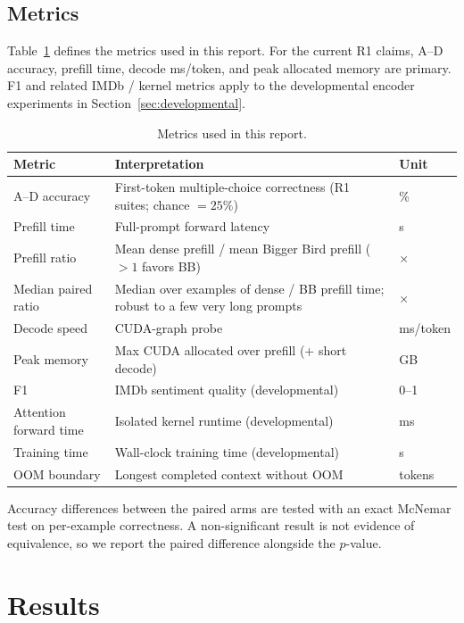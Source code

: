 \documentclass[11pt]{article}
\begin{document}
\subsection{Metrics}
\label{sec:metrics}

Table~\ref{tab:metrics} defines the metrics used in this report. For the
current R1 claims, A--D accuracy, prefill time, decode ms/token, and peak
allocated memory are primary. F1 and related IMDb / kernel metrics apply to
the developmental encoder experiments in Section~\ref{sec:developmental}.

\begin{table}[ht]
  \centering
  \small
  \caption{Metrics used in this report.}
  \label{tab:metrics}
  \begin{tabularx}{\textwidth}{@{}lXl@{}}
    \toprule
    Metric & Interpretation & Unit \\
    \midrule
    A--D accuracy & First-token multiple-choice correctness (R1 suites;
      chance $=25\%$) & \% \\
    Prefill time & Full-prompt forward latency & s \\
    Prefill ratio & Mean dense prefill / mean Bigger Bird prefill
      ($>1$ favors BB) & $\times$ \\
    Median paired ratio & Median over examples of dense / BB prefill time;
      robust to a few very long prompts & $\times$ \\
    Decode speed & CUDA-graph probe 
    
    
    & ms/token \\
    Peak memory & Max CUDA allocated over prefill (+ short decode) & GB \\
    F1 & IMDb sentiment quality (developmental) & 0--1 \\
    Attention forward time & Isolated kernel runtime (developmental) & ms \\
    Training time & Wall-clock training time (developmental) & s \\
    OOM boundary & Longest completed context without OOM & tokens \\
    \bottomrule
  \end{tabularx}
\end{table}

Accuracy differences between the paired arms are tested with an exact
McNemar test on per-example correctness. A non-significant result is not
evidence of equivalence, so we report the paired difference alongside the
$p$-value.

\section{Results}
\label{sec:results}
\label{sec:r1-benchmark}
\end{document}
